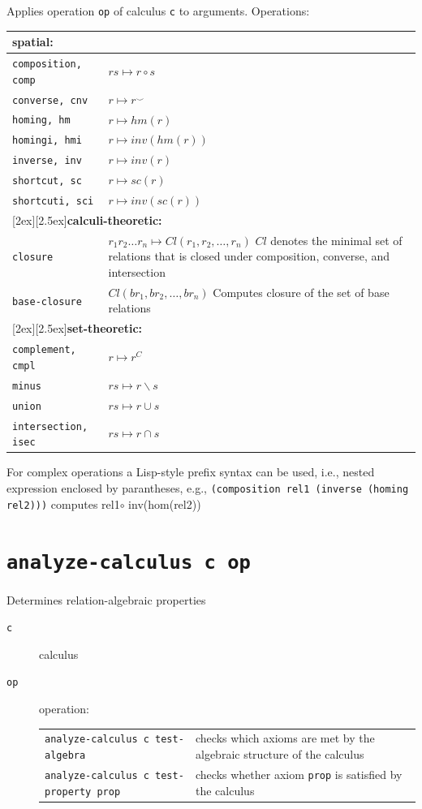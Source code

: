 \documentclass[headsepline]{scrreprt}
\theoremstyle{definition}
\newcommand{\binaryonly}{\raisebox{1ex}{\scriptsize(2)}}
\newcommand{\ternaryonly}{\raisebox{1ex}{\scriptsize(3)}}
\begin{document}
Applies operation {\tt op} of calculus {\tt c} to arguments. Operations:
\begin{longtable}{|l|p{10cm}|}
\hline
\multicolumn{2}{|l|}{\bf spatial:}\\ \hline
{\tt composition, comp} & $ r s \mapsto r \circ s$\\
{\tt converse, cnv}\binaryonly & $r \mapsto r^{\smile}$ \\
{\tt homing, hm}\ternaryonly & $ r \mapsto hm(r)$\\
{\tt homingi, hmi}\ternaryonly & $ r \mapsto inv(hm(r))$\\
{\tt inverse, inv}\ternaryonly & $ r \mapsto inv(r)$\\
{\tt shortcut, sc}\ternaryonly & $ r \mapsto sc(r)$\\
{\tt shortcuti, sci}\ternaryonly & $ r \mapsto inv(sc(r))$\\[1ex]
\hline
\multicolumn{2}{|l|}{\raisebox{-2ex}[2ex][2.5ex]{{\bf calculi-theoretic:}}}\\ \hline
{\tt closure} & $ r_1 r_2 \ldots r_n \mapsto Cl(r_1,r_2,\ldots, r_n)$\newline
$Cl$ denotes the minimal set of relations that is closed under composition, converse,
and intersection\\
{\tt base-closure} & $Cl(br_1,br_2,\ldots , br_n)$\newline
Computes closure of the set of base relations\\
\hline
\multicolumn{2}{|l|}{\raisebox{-2ex}[2ex][2.5ex]{{\bf set-theoretic:}}}\\ \hline
{\tt complement, cmpl} & $ r \mapsto r^C$\\
{\tt minus} & $ r s \mapsto r \backslash s$\\
{\tt union} & $ r s \mapsto r \cup s$\\
{\tt intersection, isec} & $ r s \mapsto r \cap s$\\
\hline
\end{longtable}
For complex operations a Lisp-style prefix syntax can be used, i.e., nested expression enclosed by parantheses, e.g., {\tt (composition rel1 (inverse (homing rel2)))} computes rel1$\circ$ inv(hom(rel2))

\section*{\tt analyze-calculus c op}
Determines relation-algebraic properties
\begin{description}
	\item[{\tt c}] calculus
	\item[{\tt op}] operation:
	\begin{longtable}{|lp{6cm}|}
	\hline
{\tt analyze-calculus c test-algebra} &  checks which axioms are met by the algebraic structure of the calculus\\
{\tt analyze-calculus c test-property prop} &  checks whether axiom {\tt prop} is satisfied by the calculus\\
\hline
\end{longtable}
\end{description}
\end{document}
